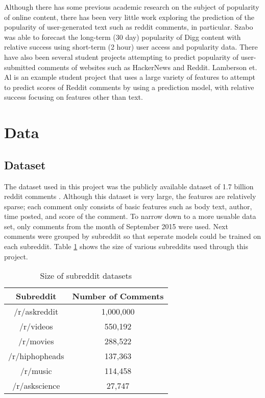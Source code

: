 \documentclass[11pt, twocolumn]{article}
\begin{document}
Although there has some previous academic research on the subject of popularity of online content, there has been very little work exploring the prediction of the popularity of user-generated text such as reddit comments, in particular. Szabo \cite{predict_digg} was able to forecast the long-term (30 day) popularity of Digg content with relative success using short-term (2 hour) user access and popularity data. There have also been several student projects attempting to predict popularity of user-submitted comments of websites such as HackerNews and Reddit. Lamberson et. Al \cite{lamberson} is an example student project that uses a large variety of features to attempt to predict scores of Reddit comments by using a prediction model, with relative success focusing on features other than text.

\section{Data}
	\subsection{Dataset}
	The dataset used in this project was the publicly available dataset of 1.7 billion reddit comments \cite{dataset}. Although this dataset is very large, the features are relatively sparse; each comment only consists of basic features such as body text, author, time posted, and score of the comment. To narrow down to a more usuable data set, only comments from the month of September 2015 were used. Next comments were grouped by subreddit so that seperate models could be trained on each subreddit. Table \ref{size_table} shows the size of various subreddits used through this project.
	
	\begin{table}[h!]
	\centering
	\begin{tabular}{ | c | c |}
	\hline
	Subreddit & Number of Comments \\
	\hline
	\hline
	/r/askreddit & 1,000,000 \\
	\hline
	/r/videos & 550,192 \\
	\hline
	/r/movies & 288,522 \\
	\hline
	/r/hiphopheads & 137,363 \\
	\hline
	/r/music & 114,458 \\
	\hline
	/r/askscience & 27,747 \\
	\hline
	\end{tabular}
	\caption{Size of subreddit datasets}
	\label{size_table}
	\end{table}
	
\end{document}
